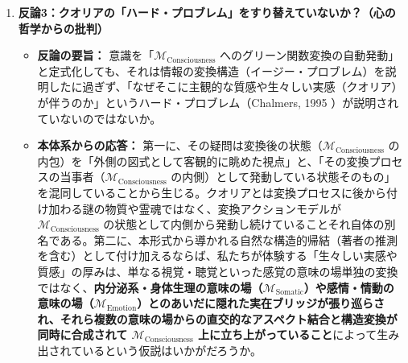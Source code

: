 \documentclass[11pt,a4paper]{ltjsarticle}
\theoremstyle{definition}
\theoremstyle{plain}
\begin{document}
\begin{enumerate}
    \item \textbf{反論3：クオリアの「ハード・プロブレム」をすり替えていないか？（心の哲学からの批判）}
    \begin{itemize}
        \item \textbf{反論の要旨：} 意識を「$\mathcal{M}_{\mathrm{Consciousness}}$ へのグリーン関数変換の自動発動」と定式化しても、それは情報の変換構造（イージー・プロブレム）を説明したに過ぎず、「なぜそこに主観的な質感や生々しい実感（クオリア）が伴うのか」というハード・プロブレム（Chalmers, 1995 \cite{Chalmers1995}）が説明されていないのではないか。
        \item \textbf{本体系からの応答：} 第一に、その疑問は変換後の状態（$\mathcal{M}_{\mathrm{Consciousness}}$ の内包）を「外側の図式として客観的に眺めた視点」と、「その変換プロセスの当事者（$\mathcal{M}_{\mathrm{Consciousness}}$ の内側）として発動している状態そのもの」を混同していることから生じる。クオリアとは変換プロセスに後から付け加わる謎の物質や霊魂ではなく、変換アクションモデルが $\mathcal{M}_{\mathrm{Consciousness}}$ の状態として内側から発動し続けていることそれ自体の別名である。第二に、本形式から導かれる自然な構造的帰結（著者の推測を含む）として付け加えるならば、私たちが体験する「生々しい実感や質感」の厚みは、単なる視覚・聴覚といった感覚の意味の場単独の変換ではなく、\textbf{内分泌系・身体生理の意味の場（$\mathcal{M}_{\mathrm{Somatic}}$）や感情・情動の意味の場（$\mathcal{M}_{\mathrm{Emotion}}$）とのあいだに隠れた実在ブリッジが張り巡らされ、それら複数の意味の場からの直交的なアスペクト結合と構造変換が同時に合成されて $\mathcal{M}_{\mathrm{Consciousness}}$ 上に立ち上がっていること}によって生み出されているという仮説はいかがだろうか。
    \end{itemize}


\end{enumerate}
\end{document}
